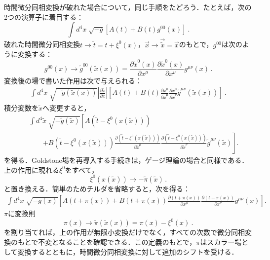 時間微分同相変換が破れた場合について，同じ手順をたどろう．たとえば，次の2つの演算子に着目する：
\begin{equation}
\int d^4x\;  \sqrt{-g} \left[A(t)+B(t)g^{00}(x)\right] \ .
\end{equation}
破れた時間微分同相変換$t \to \widetilde t= t + \xi^0(x)$，$\vec{x} \to \vec{\widetilde{x}}=\vec{x}$のもとで，$g^{00}$は次のように変換する：
\begin{equation}
g^{00}(x)\to \widetilde g^{00}(\widetilde x(x))=\frac{\partial \widetilde x^0(x)}{\partial x^\mu}\frac{\partial \widetilde x^0(x)}{\partial x^\nu} g^{\mu\nu}(x) \,  .
\end{equation}
変換後の場で書いた作用は次で与えられる：
\begin{eqnarray}
\int d^4x\;  \sqrt{-\widetilde g(\widetilde x(x))} \left|\frac{\partial \widetilde x}{\partial x} \right| \left[A(t)+B(t) \frac{\partial x^0}{\partial \widetilde x^\mu}\frac{\partial x^0}{\partial \widetilde x^\nu} \widetilde g^{\mu\nu}(\widetilde x(x))\right]\ .
\end{eqnarray}
積分変数を$\widetilde x$へ変更すると，
\begin{eqnarray}
&&\int d^4\widetilde x\;  \sqrt{-\widetilde g(\widetilde x)} \left[A(\widetilde t-\xi^0(x(\widetilde x)))\right.\nonumber \\ &&\qquad\left.+B(\widetilde t-\xi^0(x(\widetilde x))) \frac{\partial (\widetilde t-\xi^0(x(\widetilde x)))}{\partial \widetilde x^\mu}\frac{\partial (\widetilde t-\xi^0(x(\widetilde x)))}{\partial \widetilde x^\nu} \widetilde g^{\mu\nu}(\widetilde x)\right].
\end{eqnarray}
を得る．Goldstone場を再導入する手続きは，ゲージ理論の場合と同様である．上の作用に現れる$\xi^0$をすべて，
\begin{equation} 
\xi^0(x(\widetilde x)) \to - \widetilde \pi(\widetilde x ) \, .
\end{equation}
と置き換える．簡単のためチルダを省略すると，次を得る：
\begin{eqnarray}
\int d^4x\;  \sqrt{- g(x)} \left[A( t+\pi(x))+B(t+\pi(x)) \frac{\partial (t+\pi(x))}{\partial x^\mu}\frac{\partial (t+\pi(x))}{\partial x^\nu} g^{\mu\nu}(x)\right].
\end{eqnarray}
$\pi$に変換則
\begin{equation}
\pi(x) \to \widetilde\pi(\widetilde x(x))=\pi(x)-\xi^0(x) \ .
\end{equation}
を割り当てれば，上の作用が無限小変換だけでなく，すべての次数で微分同相変換のもとで不変となることを確認できる．この定義のもとで，$\pi$はスカラー場として変換するとともに，時間微分同相変換に対して追加のシフトを受ける．

